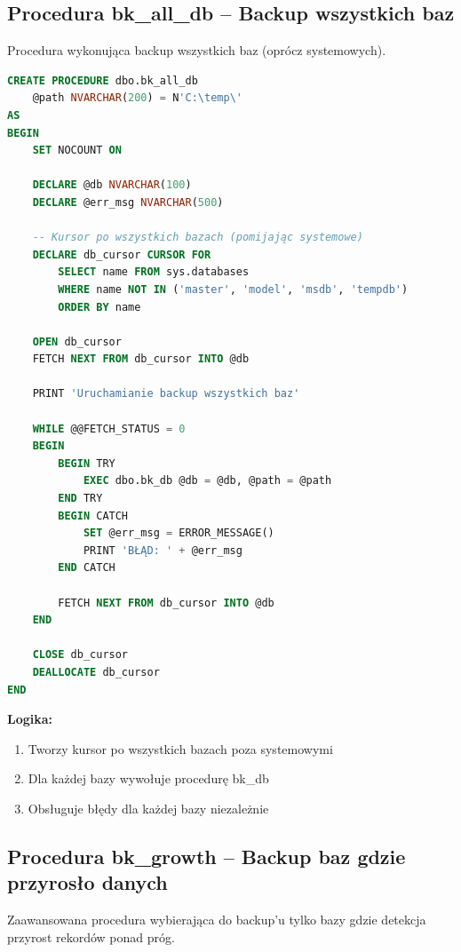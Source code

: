 \documentclass[a4paper,11pt]{article}
\begin{document}
	\subsection{Procedura bk\_all\_db -- Backup wszystkich baz}
	
	Procedura wykonująca backup wszystkich baz (oprócz systemowych).
	
	\begin{lstlisting}[language=SQL]
CREATE PROCEDURE dbo.bk_all_db
	@path NVARCHAR(200) = N'C:\temp\'
AS
BEGIN
	SET NOCOUNT ON
	
	DECLARE @db NVARCHAR(100)
	DECLARE @err_msg NVARCHAR(500)
	
	-- Kursor po wszystkich bazach (pomijając systemowe)
	DECLARE db_cursor CURSOR FOR
		SELECT name FROM sys.databases 
		WHERE name NOT IN ('master', 'model', 'msdb', 'tempdb')
		ORDER BY name
	
	OPEN db_cursor
	FETCH NEXT FROM db_cursor INTO @db
	
	PRINT 'Uruchamianie backup wszystkich baz'
	
	WHILE @@FETCH_STATUS = 0
	BEGIN
		BEGIN TRY
			EXEC dbo.bk_db @db = @db, @path = @path
		END TRY
		BEGIN CATCH
			SET @err_msg = ERROR_MESSAGE()
			PRINT 'BŁĄD: ' + @err_msg
		END CATCH
		
		FETCH NEXT FROM db_cursor INTO @db
	END
	
	CLOSE db_cursor
	DEALLOCATE db_cursor
END
	\end{lstlisting}
	
	\textbf{Logika:}
	\begin{enumerate}
		\item Tworzy kursor po wszystkich bazach poza systemowymi
		\item Dla każdej bazy wywołuje procedurę bk\_db
		\item Obsługuje błędy dla każdej bazy niezależnie
	\end{enumerate}
	
	\subsection{Procedura bk\_growth -- Backup baz gdzie przyrosło danych}
	
	Zaawansowana procedura wybierająca do backup'u tylko bazy gdzie detekcja przyrost rekordów ponad próg.
	
\end{document}
